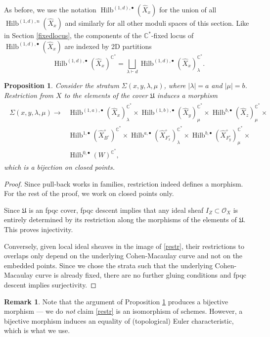 \documentclass{amsart}
\newtheorem{proposition}[theorem]{Proposition}
\theoremstyle{definition}
\newtheorem{remark}[theorem]{Remark}
\newcommand{\CC} {\mathbb{C}}          %
\renewcommand{\O}{\mathcal{O}}
\newcommand{\Hilb}{\operatorname{Hilb}}
\newcommand{\Xhat}{\widehat{X}}
\begin{document}
As before, we use the notation $\Hilb^{(1,d),\bullet}(\Xhat _x)$ for the union of all $\Hilb^{(1,d),n}(\Xhat _x)$ and similarly for all other moduli spaces of this section. Like in Section \ref{fixedlocus}, the components of the $\CC^*$-fixed locus of $\Hilb^{(1,d),\bullet}(\Xhat _x)$ are indexed by 2D partitions 
$$
\Hilb^{(1,d),\bullet}(\Xhat _x)^{\CC^*} = \bigsqcup_{\lambda \vdash d} \Hilb^{(1,d),\bullet}(\Xhat _x)_{\lambda}^{\CC^*}.
$$

\begin{proposition} \label{bij}
Consider the stratum $\Sigma(x,y,\lambda,\mu)$, where $|\lambda|=a$ and $|\mu|=b$. Restriction from $X$ to the elements of the cover $\mathfrak{U}$ induces a morphism
\begin{align}
\begin{split} \label{restr}
\Sigma(x,y,\lambda,\mu) \longrightarrow &\Hilb^{(1,a),\bullet}(\Xhat _x)_{\lambda}^{\CC^*} \times \Hilb^{(1,b),\bullet}(\Xhat _y)_{\mu}^{\CC^*} \times \Hilb^{b,\bullet}(\Xhat _z)_{\mu}^{\CC^*} \times \\
&\Hilb^{1,\bullet}(\Xhat ^{\circ}_{B^\circ})^{\CC^*} \times \Hilb^{a,\bullet}(\Xhat ^{\circ}_{F_{x}^{\circ}})_{\lambda}^{\CC^*} \times \Hilb^{b,\bullet}(\Xhat ^{\circ}_{F_{y}^{\circ}})_{\mu}^{\CC^*} \times \\
&\Hilb^{0,\bullet}(W)^{\CC^*},
\end{split}
\end{align}
which is a bijection on closed points.
\end{proposition}
\begin{proof}
Since pull-back works in families, restriction indeed defines a morphism. For the rest of the proof, we work on closed points only.

Since $\mathfrak{U}$ is an fpqc cover, fpqc descent implies that any ideal sheaf $I_Z \subset \O_X$ is entirely determined by its restriction along the morphisms of the elements of $\mathfrak{U}$. This proves injectivity.

Conversely, given local ideal sheaves in the image of \eqref{restr},
their restrictions to overlaps only depend on the underlying
Cohen-Macaulay curve and not on the embedded points. Since we chose
the strata such that the underlying Cohen-Macaulay curve is already
fixed, there are no further gluing conditions and fpqc descent implies
surjectivity.
\end{proof}
   
\begin{remark}
Note that the argument of Proposition \ref{bij} produces a bijective
morphism --- we do \emph{not} claim \eqref{restr} is an
isomorphism of schemes. However, a bijective morphism induces an
equality of (topological) Euler characteristic, which is what we use.
\end{remark}
\end{document}

